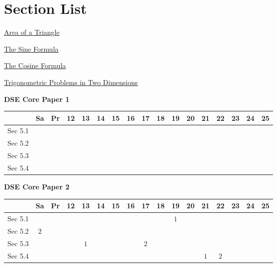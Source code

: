 \documentclass[12pt, a4paper]{article}
\begin{document}
\section*{Section List}
\begin{enumx}[label=Sec 5.\arabic*\ ]
\item \hyperref[section:5-5-1]{Area of a Triangle \NF}
\item \hyperref[section:5-5-2]{The Sine Formula \NF}
\item \hyperref[section:5-5-3]{The Cosine Formula \NF}
\item \hyperref[section:5-5-4]{Trigonometric Problems in Two Dimensions \NF}
\end{enumx}
\begin{absolutelynopagebreak}
\begin{center}
\textbf{DSE Core Paper 1}
\end{center}
\begin{center}
\begin{tabular}{|l|c|c|c|c|c|c|c|c|c|c|c|c|c|c|c|c|}
\hline
        & Sa & Pr & 12 & 13 & 14 & 15 & 16 & 17 & 18 & 19 & 20 & 21 & 22 & 23 & 24 & 25 \\\hline\hline
Sec 5.1 &  &  &  &  &  &  &  &  &  &  &  &  &  &  &  &  \\\hline
Sec 5.2 &  &  &  &  &  &  &  &  &  &  &  &  &  &  &  &  \\\hline
Sec 5.3 &  &  &  &  &  &  &  &  &  &  &  &  &  &  &  &  \\\hline
Sec 5.4 &  &  &  &  &  &  &  &  &  &  &  &  &  &  &  &  \\\hline
\end{tabular}
\end{center}
\end{absolutelynopagebreak}
\begin{absolutelynopagebreak}
\begin{center}
\textbf{DSE Core Paper 2}
\end{center}
\begin{center}
\begin{tabular}{|l|c|c|c|c|c|c|c|c|c|c|c|c|c|c|c|c|}
\hline
        & Sa & Pr & 12 & 13 & 14 & 15 & 16 & 17 & 18 & 19 & 20 & 21 & 22 & 23 & 24 & 25 \\\hline\hline
Sec 5.1 &  &  &  &  &  &  &  &  &  &  $1$ &  &  &  &  &  &  \\\hline
Sec 5.2 &  $2$ &  &  &  &  &  &  &  &  &  &  &  &  &  &  &  \\\hline
Sec 5.3 &  &  &  &  $1$ &  &  &  &  $2$ &  &  &  &  &  &  &  &  \\\hline
Sec 5.4 &  &  &  &  &  &  &  &  &  &  &  &  $1$ &  $2$ &  &  &  \\\hline
\end{tabular}
\end{center}
\end{absolutelynopagebreak}
\end{document}
